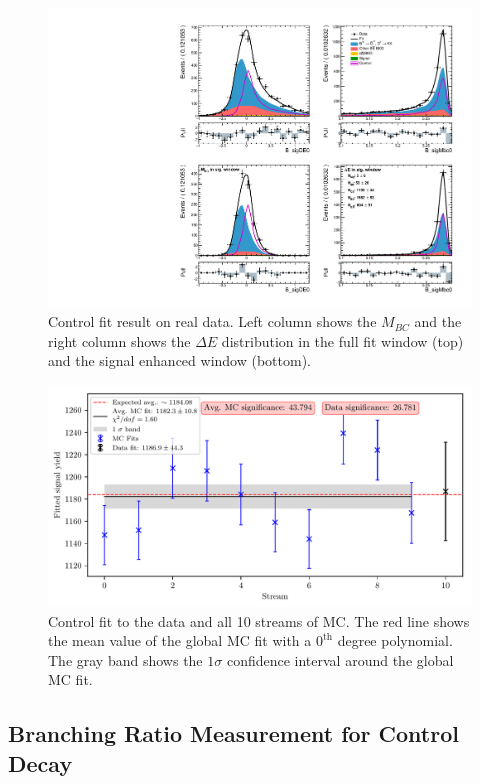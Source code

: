 \begin{figure}[H]
	\centering
	\captionsetup{width=0.8\linewidth}
	\includegraphics[width=\linewidth]{fig/cs_fit_data}
	\caption{Control fit result on real data. Left column shows the $M_{BC}$ and the right column shows the $\Delta E$ distribution in the full fit window (top) and the signal enhanced window (bottom).}
	\label{fig:cs_fit_data}
\end{figure}

\begin{figure}[H]
	\centering
	\captionsetup{width=0.8\linewidth}
	\includegraphics[width=\linewidth]{fig/cs_global}
	\caption{Control fit to the data and all 10 streams of MC. The red line shows the mean value of the global MC fit with a $0^{\mathrm{th}}$ degree polynomial. The gray band shows the $1\sigma$ confidence interval around the global MC fit.}
	\label{fig:cs_global}
\end{figure}

\subsection{Branching Ratio Measurement for Control Decay}\label{sec:branching-ratio-measurement-for-control-decay}


